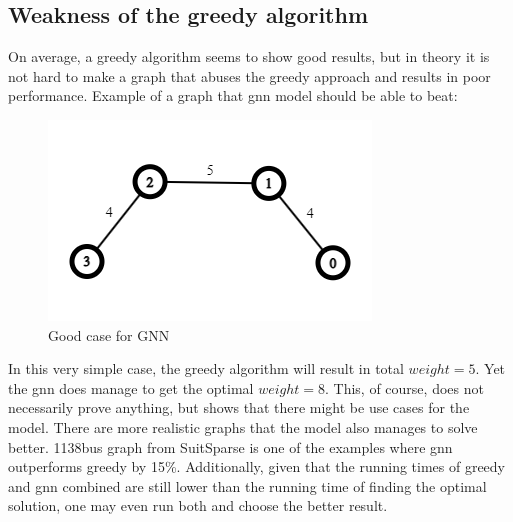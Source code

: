 \subsection{Weakness of the greedy algorithm}
\label{sec:greedybadcase}
On average, a greedy algorithm seems to show good results, but in theory it is not hard to make a graph that abuses the greedy approach and results in poor performance. Example of a graph that \gls{gnn} model should be able to beat:

\begin{figure}[H]
    \centering
    \includegraphics[scale=1.0]{figures/GoodCase}
    \caption{Good case for GNN}
    \label{Good case for GNN}
\end{figure}

In this very simple case, the greedy algorithm will result in total $weight = 5$. Yet the \gls{gnn} does manage to get the optimal $weight = 8$. This, of course, does not necessarily prove anything, but shows that there might be use cases for the model. There are more realistic graphs that the model also manages to solve better. 1138bus graph from SuitSparse is one of the examples where \gls{gnn} outperforms greedy by 15\%. Additionally, given that the running times of greedy and \gls{gnn} combined are still lower than the running time of finding the optimal solution, one may even run both and choose the better result.